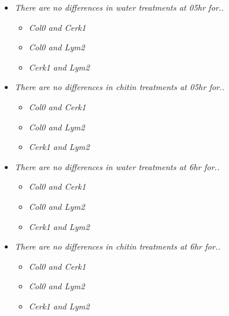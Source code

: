 \documentclass[11pt]{article}
\begin{document}
\begin{itemize}
\item \emph{There are no differences in water treatments at 05hr for..}\\
\begin{itemize}
\item \emph{Col0 and Cerk1}\\
\item \emph{Col0 and Lym2}\\
\item \emph{Cerk1 and Lym2}\\
\end{itemize}

\item \emph{There are no differences in chitin treatments at 05hr for..}\\
\begin{itemize}
\item \emph{Col0 and Cerk1}\\
\item \emph{Col0 and Lym2}\\
\item \emph{Cerk1 and Lym2}\\
\end{itemize}

\item \emph{There are no differences in water treatments at 6hr for..}\\
\begin{itemize}
\item \emph{Col0 and Cerk1}\\
\item \emph{Col0 and Lym2}\\
\item \emph{Cerk1 and Lym2}\\
\end{itemize}

\item \emph{There are no differences in chitin treatments at 6hr for..}\\
\begin{itemize}
\item \emph{Col0 and Cerk1}\\
\item \emph{Col0 and Lym2}\\
\item \emph{Cerk1 and Lym2}\\
\end{itemize}
\end{itemize}
\end{document}
